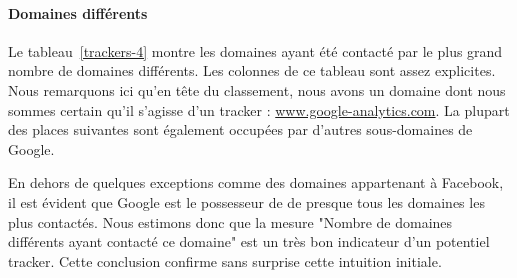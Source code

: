 			\paragraph{Domaines différents} Le tableau~\ref{trackers-4} montre les domaines ayant été contacté par le plus grand nombre de domaines différents. Les colonnes de ce tableau sont assez explicites. Nous remarquons ici qu'en tête du classement, nous avons un domaine dont nous sommes certain qu'il s'agisse d'un tracker : \url{www.google-analytics.com}. La plupart des places suivantes sont également occupées par d'autres sous-domaines de Google.

			En dehors de quelques exceptions comme des domaines appartenant à Facebook, il est évident que Google est le possesseur de de presque tous les domaines les plus contactés. Nous estimons donc que la mesure "Nombre de domaines différents ayant contacté ce domaine" est un très bon indicateur d'un potentiel tracker. Cette conclusion confirme sans surprise cette intuition initiale.


